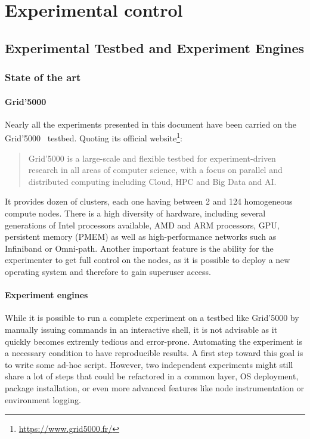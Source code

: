 \part{Experimental control}
\label{part:experiment}

\chapter{Experimental Testbed and Experiment Engines}%
\label{chapter:experiment:testbed}

    \section{State of the art}%
    \label{sec:state_of_the_art}

        \subsection{Grid'5000}%
        \label{sub:grid_5000}

            Nearly all the experiments presented in this document have been carried on the Grid'5000~\cite{grid5000}
            testbed.  Quoting its official website\footnote{\url{https://www.grid5000.fr/}}: \blockquote{Grid'5000 is a
            large-scale and flexible testbed for experiment-driven research in all areas of computer science, with a
            focus on parallel and distributed computing including Cloud, HPC and Big Data and AI.} It provides dozen of
            clusters, each one having between 2 and 124 homogeneous compute nodes. There is a high diversity of hardware,
            including several generations of Intel processors available, AMD and ARM processors, GPU, persistent memory
            (PMEM) as well as high-performance networks such as Infiniband or Omni-path. Another important feature is the
            ability for the experimenter to get full control on the nodes, as it is possible to deploy a new operating
            system and therefore to gain superuser access.

        \subsection{Experiment engines}%
        \label{sub:experiment_engines}

            While it is possible to run a complete experiment on a testbed like Grid'5000 by manually issuing commands
            in an interactive shell, it is not advisable as it quickly becomes extremly tedious and error-prone.
            Automating the experiment is a necessary condition to have reproducible results. A first step toward this
            goal is to write some ad-hoc script. However, two independent experiments might still share a lot of steps
            that could be refactored in a common layer, \eg OS deployment, package installation, or even more advanced
            features like node instrumentation or environment logging.


